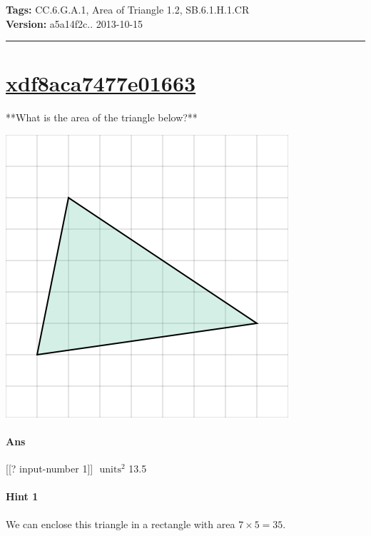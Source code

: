 \documentclass[twocolumn,10pt]{article}
\def\shrinkfactor{0.55}
\begin{document}
\medskip
\noindent
\textbf{Tags:} {\footnotesize CC.6.G.A.1, Area of Triangle 1.2, SB.6.1.H.1.CR}\\
\textbf{Version:} a5a14f2c.. 2013-10-15
\smallskip\hrule





\section{\href{https://www.khanacademy.org/devadmin/content/items/xdf8aca7477e01663}{xdf8aca7477e01663}}

\noindent
**What is the area of the triangle below?**  


\includegraphics[scale=\shrinkfactor]{figures/406a447fc20d8d6377ba34e308ded67b6d6895a7.png}

\paragraph{Ans} [[? input-number 1]] $\text{ units}^2$  13.5

\paragraph{Hint 1}We can enclose this triangle in a rectangle with area $7 \times 5 =35$.   
\end{document}
